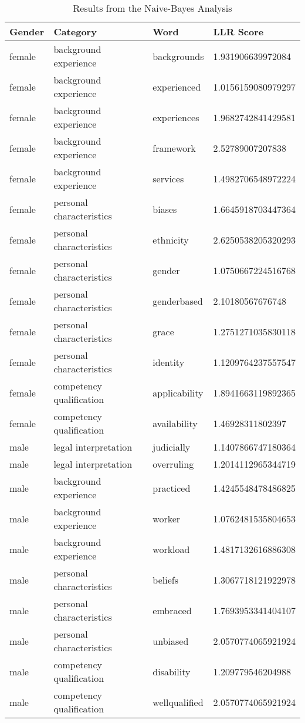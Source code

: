 \documentclass[titlepage]{article}
\begin{document}
\begin{table}[H] \label{tab:naive-bayes}
    \centering
    \begin{tabular}{llll}
    \toprule
    \textbf{Gender} & \textbf{Category} & \textbf{Word} & \textbf{LLR Score} \\
    \midrule
    female & background experience & backgrounds & 1.931906639972084 \\
    female & background experience & experienced & 1.0156159080979297 \\
    female & background experience & experiences & 1.9682742841429581 \\
    female & background experience & framework & 2.52789007207838 \\
    female & background experience & services & 1.4982706548972224 \\
    \midrule
    female & personal characteristics & biases & 1.6645918703447364 \\
    female & personal characteristics & ethnicity & 2.6250538205320293 \\
    female & personal characteristics & gender & 1.0750667224516768 \\
    female & personal characteristics & genderbased & 2.10180567676748 \\
    female & personal characteristics & grace & 1.2751271035830118 \\
    female & personal characteristics & identity & 1.1209764237557547 \\
    \midrule
    female & competency qualification & applicability & 1.8941663119892365 \\
    female & competency qualification & availability & 1.46928311802397 \\
    \midrule
    male & legal interpretation & judicially & 1.1407866747180364 \\
    male & legal interpretation & overruling & 1.2014112965344719 \\
    \midrule
    male & background experience & practiced & 1.4245548478486825 \\
    male & background experience & worker & 1.0762481535804653 \\
    male & background experience & workload & 1.4817132616886308 \\
    \midrule
    male & personal characteristics & beliefs & 1.3067718121922978 \\
    male & personal characteristics & embraced & 1.7693953341404107 \\
    male & personal characteristics & unbiased & 2.0570774065921924 \\
    \midrule
    male & competency qualification & disability & 1.209779546204988 \\
    male & competency qualification & wellqualified & 2.0570774065921924 \\
    \bottomrule
    \end{tabular}
    \caption{Results from the Naive-Bayes Analysis}
\end{table}
\end{document}
